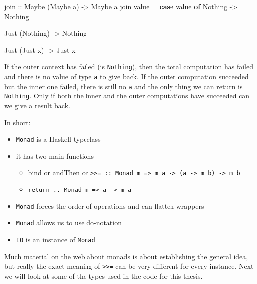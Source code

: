 \documentclass[runningheads,plain]{llncs}
\providecommand{\tightlist}{%
  \setlength{\itemsep}{0pt}\setlength{\parskip}{0pt}}
\newenvironment{Shaded}{}{}
\newcommand{\KeywordTok}[1]{\textcolor[rgb]{0.00,0.44,0.13}{\textbf{#1}}}
\newcommand{\DataTypeTok}[1]{\textcolor[rgb]{0.56,0.13,0.00}{#1}}
\newcommand{\OtherTok}[1]{\textcolor[rgb]{0.00,0.44,0.13}{#1}}
\newcommand{\FunctionTok}[1]{\textcolor[rgb]{0.02,0.16,0.49}{#1}}
\newcommand{\NormalTok}[1]{#1}
\begin{document}
\begin{Shaded}
\begin{Highlighting}[]
\OtherTok{join ::} \DataTypeTok{Maybe}\NormalTok{ (}\DataTypeTok{Maybe}\NormalTok{ a) }\OtherTok{->} \DataTypeTok{Maybe}\NormalTok{ a}
\NormalTok{join value }\FunctionTok{=} 
    \KeywordTok{case}\NormalTok{ value }\KeywordTok{of} 
        \DataTypeTok{Nothing} \OtherTok{->} 
            \DataTypeTok{Nothing}

        \DataTypeTok{Just}\NormalTok{ (}\DataTypeTok{Nothing}\NormalTok{) }\OtherTok{->} 
            \DataTypeTok{Nothing}

        \DataTypeTok{Just}\NormalTok{ (}\DataTypeTok{Just}\NormalTok{ x) }\OtherTok{->} 
            \DataTypeTok{Just}\NormalTok{ x}
\end{Highlighting}
\end{Shaded}

If the outer context has failed (is \texttt{Nothing}), then the total
computation has failed and there is no value of type \texttt{a} to give
back. If the outer computation succeeded but the inner one failed, there
is still no \texttt{a} and the only thing we can return is
\texttt{Nothing}. Only if both the inner and the outer computations have
succeeded can we give a result back.

In short:

\begin{itemize}
\tightlist
\item
  \texttt{Monad} is a Haskell typeclass
\item
  it has two main functions

  \begin{itemize}
  \tightlist
  \item
    bind or andThen or
    \texttt{\textgreater{}\textgreater{}=\ ::\ Monad\ m\ =\textgreater{}\ m\ a\ -\textgreater{}\ (a\ -\textgreater{}\ m\ b)\ -\textgreater{}\ m\ b}
  \item
    \texttt{return\ ::\ Monad\ m\ =\textgreater{}\ a\ -\textgreater{}\ m\ a}
  \end{itemize}
\item
  \texttt{Monad} forces the order of operations and can flatten wrappers
\item
  \texttt{Monad} allows us to use do-notation
\item
  \texttt{IO} is an instance of \texttt{Monad}
\end{itemize}

Much material on the web about monads is about establishing the general
idea, but really the exact meaning of
\texttt{\textgreater{}\textgreater{}=} can be very different for every
instance. Next we will look at some of the types used in the code for
this thesis.
\end{document}
